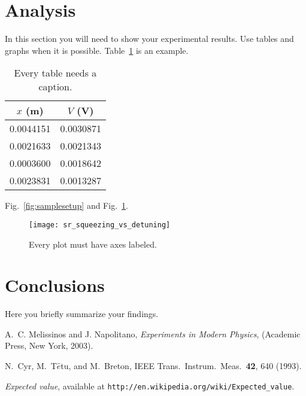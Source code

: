 \documentclass[letterpaper,12pt]{article}
\begin{document}
\section{Analysis}

In this section you will need to show your experimental results. Use tables and
graphs when it is possible. Table~\ref{tbl:bins} is an example.

\begin{table}[ht]
\begin{center}
\caption{Every table needs a caption.}
\label{tbl:bins} %
\begin{tabular}{|cc|} 
\hline
\multicolumn{1}{|c}{$x$ (m)} & \multicolumn{1}{c|}{$V$ (V)} \\
\hline
0.0044151 &   0.0030871 \\
0.0021633 &   0.0021343 \\
0.0003600 &   0.0018642 \\
0.0023831 &   0.0013287 \\
\hline
\end{tabular}
\end{center}
\end{table}

Fig.~\ref{fig:samplesetup} and Fig.~\ref{fig:exp_plots}.

\begin{figure}[ht] 
  \centering
      \texttt{[image: sr\_squeezing\_vs\_detuning]}

        \caption{
                \label{fig:exp_plots}  
                Every plot must have axes labeled.
        }
\end{figure}


\section{Conclusions}
Here you briefly summarize your findings.


\begin{thebibliography}{99}

A.~C. Melissinos and J. Napolitano, \textit{Experiments in Modern Physics},
(Academic Press, New York, 2003).

N.\ Cyr, M.\ T$\hat{e}$tu, and M.\ Breton,
IEEE Trans.\ Instrum.\ Meas.\ \textbf{42}, 640 (1993).

 \emph{Expected value},  available at
\texttt{http://en.wikipedia.org/wiki/Expected\_value}.

\end{thebibliography}
\end{document}
